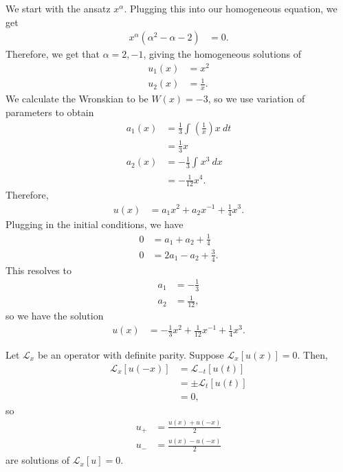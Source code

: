 \documentclass[10pt]{mypackage}
\begin{document}
\begin{solution}[39.18]
  We start with the ansatz $x^{\alpha}$. Plugging this into our homogeneous equation, we get
  \begin{align*}
    x^{\alpha}\left( \alpha^2 - \alpha - 2 \right) &= 0.
  \end{align*}
  Therefore, we get that $\alpha =2,-1$, giving the homogeneous solutions of
  \begin{align*}
    u_1(x) &= x^2\\
    u_2(x) &= \frac{1}{x}.
  \end{align*}
  We calculate the Wronskian to be $W(x) = -3$, so we use variation of parameters to obtain
  \begin{align*}
    a_1(x) &= \frac{1}{3} \int_{}^{} \left( \frac{1}{x} \right)x\:dt\\
           &= \frac{1}{3}x\\
    a_2(x) &= -\frac{1}{3} \int_{}^{} x^3\:dx\\
           &= -\frac{1}{12}x^4.
  \end{align*}
  Therefore,
  \begin{align*}
    u(x) &= a_1x^2 + a_2x^{-1} + \frac{1}{4}x^3.
  \end{align*}
  Plugging in the initial conditions, we have
  \begin{align*}
    0 &= a_1 + a_2 + \frac{1}{4}\\
    0 &= 2a_1 - a_2 + \frac{3}{4}.
  \end{align*}
  This resolves to
  \begin{align*}
    a_1 &= -\frac{1}{3}\\
    a_2 &= \frac{1}{12},
  \end{align*}
  so we have the solution
  \begin{align*}
    u(x) &= -\frac{1}{3}x^2 + \frac{1}{12}x^{-1} + \frac{1}{4}x^3.
  \end{align*}
\end{solution}
\begin{solution}[39.21]
  Let $\mathcal{L}_x$ be an operator with definite parity. Suppose $\mathcal{L}_x\left[ u(x) \right] = 0$. Then,
  \begin{align*}
    \mathcal{L}_x\left[ u(-x) \right] &= \mathcal{L}_{-t}\left[ u(t) \right]\\
                                      &= \pm \mathcal{L}_t\left[ u(t) \right]\\
                                      &= 0,
  \end{align*}
  so
  \begin{align*}
    u_+ &= \frac{u(x) + u(-x)}{2}\\
    u_{-} &= \frac{u(x) - u(-x)}{2}
  \end{align*}
  are solutions of $\mathcal{L}_x\left[ u \right]=  0$.
\end{solution}
\end{document}
